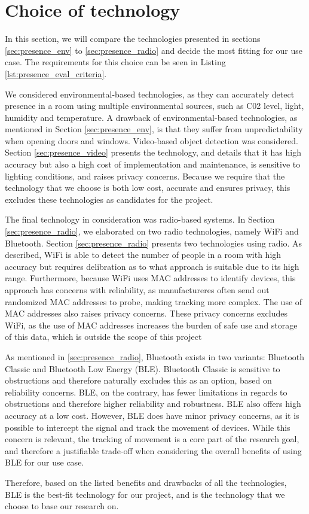 \section{Choice of technology}
In this section, we will compare the technologies presented in sections \ref{sec:presence_env} to \ref{sec:presence_radio} and decide the most fitting for our use case. 
The requirements for this choice can be seen in Listing \ref{lst:presence_eval_criteria}. 

We considered environmental-based technologies, as they can accurately detect presence in a room using multiple environmental sources, such as C02 level, light, humidity and temperature.
A drawback of environmental-based technologies, as mentioned in Section \ref{sec:presence_env}, is that they suffer from unpredictability when opening doors and windows. 
Video-based object detection was considered. Section \ref{sec:presence_video} presents the technology, and details that it has high accuracy but also a high cost of implementation and maintenance, is sensitive to lighting conditions, and raises privacy concerns.
Because we require that the technology that we choose is both low cost, accurate and ensures privacy, this excludes these technologies as candidates for the project.

The final technology in consideration was radio-based systems. In Section \ref{sec:presence_radio}, we elaborated on two radio technologies, namely WiFi and Bluetooth. 
Section \ref{sec:presence_radio} presents two technologies using radio.
As described, WiFi is able to detect the number of people in a room with high accuracy but requires delibration as to what approach is suitable due to its high range. 
Furthermore, because WiFi uses MAC addresses to identify devices, this approach has concerns with reliability, as manufactureres often send out randomized MAC addresses to probe, making tracking more complex. 
The use of MAC addresses also raises privacy concerns. 
These privacy concerns excludes WiFi, as the use of MAC addresses increases the burden of safe use and storage of this data, which is outside the scope of this project

As mentioned in \ref{sec:presence_radio}, Bluetooth exists in two variants: Bluetooth Classic and Bluetooth Low Energy (BLE). Bluetooth Classic is sensitive to obstructions and therefore naturally excludes this as an option, based on reliability concerns. 
BLE, on the contrary, has fewer limitations in regards to obstructions and therefore higher reliability and robustness.
BLE also offers high accuracy at a low cost.
However, BLE does have minor privacy concerns, as it is possible to intercept the signal and track the movement of devices.
While this concern is relevant, the tracking of movement is a core part of the research goal, and therefore a justifiable trade-off when considering the overall benefits of using BLE for our use case.

Therefore, based on the listed benefits and drawbacks of all the technologies, BLE is the best-fit technology for our project, and is the technology that we choose to base our research on.